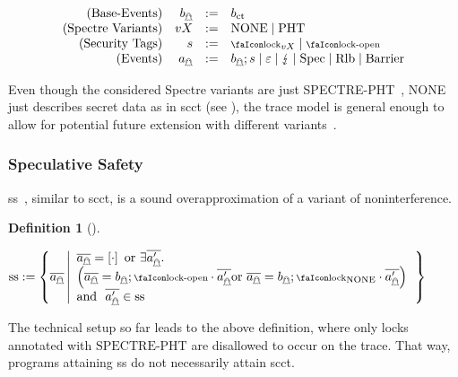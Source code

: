 \documentclass[acmsmall]{acmart}
\theoremstyle{definition}
\newtheorem{definition}{Definition}[section]
\begin{document}
\vspace{-1em}
{
\[
  \begin{array}{rrcl}
    (\text{Base-Events}) & \preevent[_{\mathghost}] &:=& \preevent[_{\ctsafe}] \\
    (\text{Spectre Variants}) & vX &:=& \operatorname{NONE} \mid \operatorname{PHT} \\
    (\text{Security Tags}) & \securitytag{} &:=& \lock_{vX} \mid \unlock\\ 
    (\text{Events}) & \event[_{\mathghost}] &:=& \preevent[_{\mathghost}];\securitytag{} \mid \emptyevent \mid \lightning \mid \ev{Spec} \mid \ev{Rlb} \mid \ev{Barrier}\\ 
  \end{array}
\]
}

Even though the considered Spectre variants are just SPECTRE-PHT~\cite{kocher2019spectre}, NONE just describes secret data as in \gls*{scct} (see ), the trace model is general enough to allow for potential future extension with different variants~\cite{kocher2019spectre,maisuradze2018ret2spec,horn2019zero}.

\subsubsection{Speculative Safety}

\gls*{ss}~\cite{patrignani2021exorcising}, similar to \gls*{scct}, is a sound overapproximation of a variant of noninterference.

\begin{definition}[]\label{def:trace:ss}
  \noindent

  \begin{nscenter}
  $
    \sssafe:=\left\{\trace[_{\mathghost}] \left|\begin{array}{l}
      \trace[_{\mathghost}]=\hole{\cdot} \text{ or } \exists\trace[_{\mathghost}'].\\
      \left(\trace[_{\mathghost}]=\preevent[_{\mathghost}];\unlock\cdot\trace[_{\mathghost}'] \text{or }\trace[_{\mathghost}]=\preevent[_{\mathghost}];\lock_{\text{NONE}}\cdot\trace[_{\mathghost}']\right)\\
      \text{and }\ \trace[_{\mathghost}']\in\sssafe
                                 \end{array}\right.\right\}
  $ 
  \end{nscenter}
\end{definition}
The technical setup so far leads to the above definition, where only locks annotated with $\text{SPECTRE-PHT}$ are disallowed to occur on the trace.
That way, programs attaining \gls*{ss} do not necessarily attain \gls*{scct}.
\end{document}
